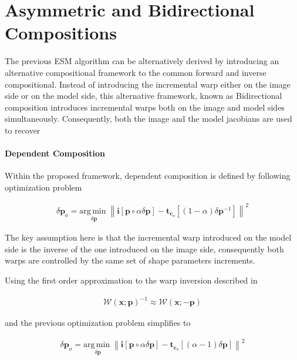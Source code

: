 \section{Asymmetric and Bidirectional Compositions}

The previous ESM algorithm can be alternatively derived by introducing an alternative compositional framework to the common forward and inverse compositional. Instead of introducing the incremental warp either on the image side or on the model side, this alternative framework, known as Bidirectional composition introduces incremental warps both on the image and model sides simultaneously. Consequently, both the image and the model jacobians are used to recover  

\paragraph{Dependent Composition}

Within the proposed framework, dependent composition is defined by following optimization problem

\begin{equation}
	\begin{aligned}
		\delta \mathbf{p}_o = \underset{\delta \mathbf{p}}{\mathrm{arg\,min\;}}
		\left\| \mathbf{i}[\mathbf{p} \circ \alpha \delta \mathbf{p}] - \mathbf{t}_{\mathbf{c}_o}[(1-\alpha) \delta \mathbf{p}^{-1}] \right\|^2
	\end{aligned}
\end{equation}

The key assumption here is that the incremental warp introduced on the model side is the inverse of the one introduced on the image side, consequently both warps are controlled by the same set of shape parameters increments.

Using the first order approximation to the warp inversion described in \cite{}

\begin{equation}
	\begin{aligned}
		\mathcal{W}(\mathbf{x}; \mathbf{p})^{-1} \approx \mathcal{W}(\mathbf{x}; -\mathbf{p})
	\end{aligned}
\end{equation}

and the previous optimization problem simplifies to

\begin{equation}
	\begin{aligned}
		\delta \mathbf{p}_o = \underset{\delta \mathbf{p}}{\mathrm{arg\,min\;}}
		\left\| \mathbf{i}[\mathbf{p} \circ \alpha \delta \mathbf{p}] - \mathbf{t}_{\mathbf{c}_o}[(\alpha - 1) \delta \mathbf{p}] \right\|^2
	\end{aligned}
\end{equation}

